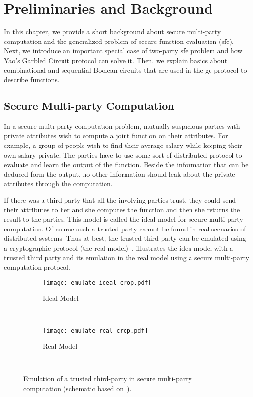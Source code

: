 \chapter{Preliminaries and Background}\label{chap:prelim}
In this chapter, we provide a short background about secure multi-party computation and the generalized problem of secure function evaluation (\acrshort{sfe}).
Next, we introduce an important special case of two-party \acrshort{sfe} problem and how Yao's Garbled Circuit protocol can solve it.
Then, we explain basics about combinational and sequential Boolean circuits that are used in the \acrshort{gc} protocol to describe functions.

\section{Secure Multi-party Computation}\label{sec:prelim-smc}
In a secure multi-party computation problem, mutually suspicious parties with private attributes wish to compute a joint function on their attributes.
For example, a group of people wish to find their average salary while keeping their own salary private.
The parties have to use some sort of distributed protocol to evaluate and learn the output of the function.
Beside the information that can be deduced form the output, no other information should leak about the private attributes through the computation.

If there was a third party that all the involving parties trust, they could send their attributes to her and she computes the function and then she returns the result to the parties.
This model is called the ideal model for secure multi-party computation.
Of course such a trusted party cannot be found in real scenarios of distributed systems.
Thus at best, the trusted third party can be emulated using a cryptographic protocol (the real model)~\cite{goldreich2013general}.
 illustrates the idea model with a trusted third party and its emulation in the real model using a secure multi-party computation protocol.

\begin{figure}
    \centering
    \begin{subfigure}[tl]{0.3\textwidth}
        \texttt{[image: emulate\_ideal-crop.pdf]}
        \caption{Ideal Model}\label{fig:ideal-model}
    \end{subfigure}
		~~~~
    \begin{subfigure}[tr]{0.3\textwidth}
        \texttt{[image: emulate\_real-crop.pdf]}
        \caption{Real Model}\label{fig:real-model}
    \end{subfigure}\\
    \caption{Emulation of a trusted third-party in secure multi-party computation (schematic based on~\cite{goldreich2013general}).}\label{fig:multi-party-model}
\end{figure}

